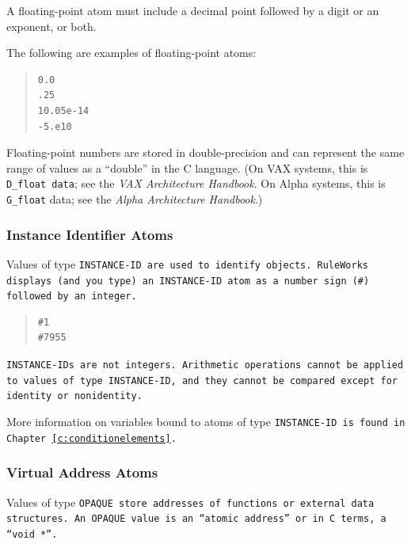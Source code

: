 \begin{note}
  A floating-point atom must include a decimal point followed by a
  digit or an exponent, or both.
\end{note}

The following are examples of floating-point atoms:

\begin{quote}
\begin{verbatim}
0.0
.25
10.05e-14
-5.e10
\end{verbatim}
\end{quote}

Floating-point numbers are stored in double-precision and can
represent the same range of values as a ``double'' in the C
language. (On VAX systems, this is \verb|D_float data|; see the
\emph{VAX Architecture Handbook}. On Alpha systems, this is
\verb|G_float| data; see the \emph{Alpha Architecture Handbook}.)

\subsubsection{Instance Identifier Atoms}

Values of type \tt{INSTANCE-ID} are used to identify objects.
RuleWorks displays (and you type) an \tt{INSTANCE-ID} atom as a number
sign (\verb|#|) followed by an integer.

\begin{quote}
\begin{verbatim}
#1
#7955
\end{verbatim}
\end{quote}

\begin{note}
  \tt{INSTANCE-ID}s are not integers. Arithmetic operations cannot be
  applied to values of type \tt{INSTANCE-ID}, and they cannot be
  compared except for identity or nonidentity.
\end{note}

More information on variables bound to atoms of type \tt{INSTANCE-ID}
is found in Chapter~\ref{c:conditionelements}.

\subsubsection{Virtual Address Atoms}

Values of type \tt{OPAQUE} store addresses of functions or
external data structures. An \tt{OPAQUE} value is an ``atomic
address'' or in C terms, a ``void *''.

